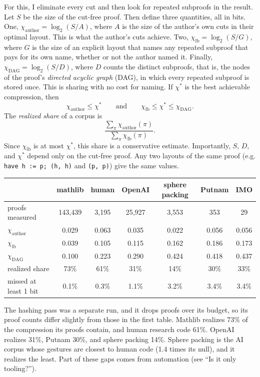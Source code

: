 \documentclass{article}
\begin{document}
For this, I eliminate every cut and then look for repeated subproofs in the result. Let $S$ be the size of the
cut-free proof. Then define three quantities, all in bits. One, $\chi_{\mathrm{author}}=\log_2(S/A)$, where $A$ is the
size of the author's own cuts in their optimal layout. This is what the author's cuts achieve. Two,
$\chi_{\mathrm{lb}}=\log_2(S/G)$, where $G$ is the size of an explicit layout that names any repeated subproof that
pays for its own name, whether or not the author named it. Finally, $\chi_{\mathrm{DAG}}=\log_2(S/D)$, where $D$ counts
the distinct subproofs, that is, the nodes of the proof's \textit{directed acyclic graph} (DAG), in which every
repeated subproof is stored once. This is sharing with no cost for naming. If $\chi^*$ is the best achievable compression, then
\[
\chi_{\mathrm{author}}\leq\chi^*
\qquad\text{and}\qquad
\chi_{\mathrm{lb}}\leq\chi^*\leq\chi_{\mathrm{DAG}}.
\]
The \textit{realized share} of a corpus is
\[
\frac{\sum_\pi\chi_{\mathrm{author}}(\pi)}{\sum_\pi\chi_{\mathrm{lb}}(\pi)}.
\]
Since $\chi_{\mathrm{lb}}$ is at most $\chi^*$, this share is a conservative estimate. Importantly, $S$, $D$, and
$\chi^*$ depend only on the cut-free proof. Any two layouts of the same proof (e.g. \texttt{have h := p; (h, h)} and
\texttt{(p, p)}) give the same values.
\begin{center}
\small
\begin{tabular}{lcccccc}
 & mathlib & human & OpenAI & sphere packing & Putnam & IMO \\
\hline
proofs measured & 143,439 & 3,195 & 25,927 & 3,553 & 353 & 29 \\
$\chi_{\mathrm{author}}$ & 0.029 & 0.063 & 0.035 & 0.022 & 0.056 & 0.056 \\
$\chi_{\mathrm{lb}}$ & 0.039 & 0.105 & 0.115 & 0.162 & 0.186 & 0.173 \\
$\chi_{\mathrm{DAG}}$ & 0.100 & 0.223 & 0.290 & 0.424 & 0.418 & 0.437 \\
realized share & 73\% & 61\% & 31\% & 14\% & 30\% & 33\% \\
missed at least 1 bit & 0.1\% & 0.3\% & 1.1\% & 3.2\% & 3.4\% & 3.4\% \\
\end{tabular}
\end{center}
The hashing pass was a separate run, and it drops proofs over its budget, so its proof counts differ slightly from
those in the first table.
Mathlib realizes 73\% of the compression its proofs contain, and human research code 61\%. OpenAI realizes 31\%, Putnam
30\%, and sphere packing 14\%. Sphere packing is the AI corpus whose gestures are closest to human code
(1.4 times its null), and it realizes the least. Part of these gaps comes from automation (see ``Is it only
tooling?'').
\end{document}
